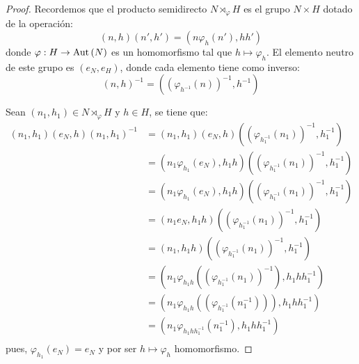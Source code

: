 \documentclass[12pt]{report}
\newcounter{it}
\theoremstyle{largebreak}
\newcommand\cf[3]{\ensuremath{#1:#2\rightarrow#3}}
\newcommand\Aut[1]{\ensuremath{\textup{Aut}\left(#1\right)}}
\begin{document}
    \begin{proof}
        Recordemos que el producto semidirecto $N\rtimes_\varphi H$ es el grupo $N\times H$ dotado de la operación:
        \begin{equation*}
            (n,h)(n',h')=(n\varphi_h(n'),hh')
        \end{equation*}
        donde $\cf{\varphi}{H}{\Aut{N}}$ es un homomorfismo tal que $h\mapsto\varphi_h$. El elemento neutro de este grupo es $(e_N,e_H)$, donde cada elemento tiene como inverso:
        \begin{equation*}
            (n,h)^{-1}=\left((\varphi_{h^{-1}}(n))^{-1},h^{-1}\right)
        \end{equation*}

        Sean $(n_1,h_1)\in N\rtimes_{\varphi}H$ y $h\in H$, se tiene que:
        \begin{equation*}
            \begin{split}
                (n_1,h_1)(e_N,h)(n_1,h_1)^{-1}&=(n_1,h_1)(e_N,h)\left((\varphi_{h_1^{-1}}(n_1))^{-1},h_1^{-1}\right)\\
                &=(n_1\varphi_{h_1}(e_N),h_1h)\left((\varphi_{h_1^{-1}}(n_1))^{-1},h_1^{-1}\right)\\
                &=(n_1\varphi_{h_1}(e_N),h_1h)\left((\varphi_{h_1^{-1}}(n_1))^{-1},h_1^{-1}\right)\\
                &=(n_1e_N,h_1h)\left((\varphi_{h_1^{-1}}(n_1))^{-1},h_1^{-1}\right)\\
                &=(n_1,h_1h)\left((\varphi_{h_1^{-1}}(n_1))^{-1},h_1^{-1}\right)\\
                &=\left(n_1\varphi_{h_1h}\left((\varphi_{h_1^{-1}}(n_1))^{-1}\right),h_1hh_1^{-1} \right)\\
                &=\left(n_1\varphi_{h_1h}\left((\varphi_{h_1^{-1}}(n_1^{-1}))\right),h_1hh_1^{-1} \right)\\
                &=\left(n_1\varphi_{h_1h h_1^{-1}}\left(n_1^{-1}\right),h_1hh_1^{-1} \right)\\
            \end{split}
        \end{equation*}
        pues, $\varphi_{h_1}(e_N)=e_N$ y por ser $h\mapsto\varphi_h$ homomorfismo.


\end{proof}
\end{document}
